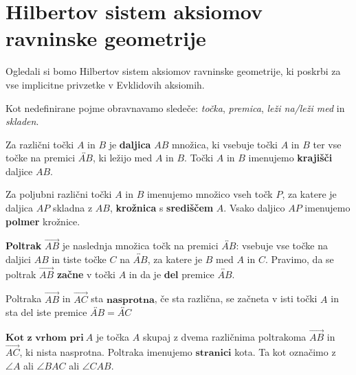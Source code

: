 \chapter{Hilbertov sistem aksiomov ravninske geometrije}

Ogledali si bomo Hilbertov sistem aksiomov ravninske geometrije, ki poskrbi za vse implicitne privzetke v Evklidovih aksiomih.

Kot nedefinirane pojme obravnavamo sledeče: \textit{točka}, \textit{premica}, \textit{leži na/leži med} in \textit{skladen}.

\begin{definicija}
    Za različni točki $A$ in  $B$ je \textbf{daljica} $AB$ množica, ki vsebuje točki $A$ in $B$ ter vse točke na premici $\overleftrightarrow{AB}$, ki ležijo med $A$ in $B$. Točki $A$ in $B$ imenujemo \textbf{krajišči} daljice $AB$.
\end{definicija}

\begin{definicija}
    Za poljubni različni točki $A$ in $B$ imenujemo množico vseh točk $P$, za katere je daljica $AP$ skladna z $AB$, \textbf{krožnica} s \textbf{središčem} $A$. Vsako daljico $AP$ imenujemo \textbf{polmer} krožnice.
\end{definicija}

\begin{definicija}
    \textbf{Poltrak} $\overrightarrow{AB}$ je naslednja množica točk na premici $\overleftrightarrow{AB}$: vsebuje vse točke na daljici $AB$ in tiste točke $C$ na $\overleftrightarrow{AB}$, za katere je $B$ med $A$ in $C$. Pravimo, da se poltrak $\overrightarrow{AB}$ \textbf{začne} v točki $A$ in da je \textbf{del} premice $\overleftrightarrow{AB}$.
\end{definicija}

\begin{definicija}
    Poltraka $\overrightarrow{AB}$ in $\overrightarrow{AC}$ sta $\textbf{nasprotna}$, če sta različna, se začneta v isti točki $A$ in sta del iste premice $\overleftrightarrow{AB}=\overleftrightarrow{AC}$
\end{definicija}

\begin{definicija}
    $\textbf{Kot z vrhom pri}~A$ je točka $A$ skupaj z dvema različnima poltrakoma $\overrightarrow{AB}$ in $\overrightarrow{AC}$, ki nista nasprotna. Poltraka imenujemo $\textbf{stranici}$ kota. Ta kot označimo z $\angle A$ ali $\angle BAC$ ali $\angle CAB$.
\end{definicija}

